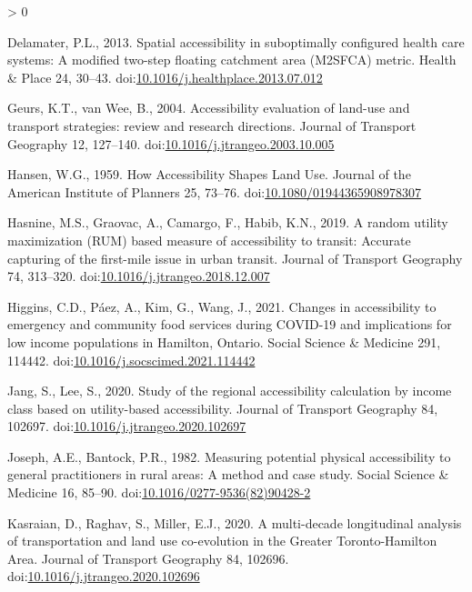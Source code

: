 \documentclass[]{elsarticle} %
\newlength{\cslhangindent}
\newenvironment{CSLReferences}[2] %
 {%
  \setlength{\parindent}{0pt}
  \ifodd #1 \everypar{\setlength{\hangindent}{\cslhangindent}}\ignorespaces\fi
  \ifnum #2 > 0
  \setlength{\parskip}{#2\baselineskip}
  \fi
 }%
 {}
\begin{document}
\begin{CSLReferences}{1}{0}
\leavevmode\hypertarget{ref-delamater2013}{}%
Delamater, P.L., 2013. Spatial accessibility in suboptimally configured
health care systems: A modified two-step floating catchment area
(M2SFCA) metric. Health \& Place 24, 30--43.
doi:\href{https://doi.org/10.1016/j.healthplace.2013.07.012}{10.1016/j.healthplace.2013.07.012}

\leavevmode\hypertarget{ref-geurs2004}{}%
Geurs, K.T., van Wee, B., 2004. Accessibility evaluation of land-use and
transport strategies: review and research directions. Journal of
Transport Geography 12, 127--140.
doi:\href{https://doi.org/10.1016/j.jtrangeo.2003.10.005}{10.1016/j.jtrangeo.2003.10.005}

\leavevmode\hypertarget{ref-hansen1959}{}%
Hansen, W.G., 1959. How Accessibility Shapes Land Use. Journal of the
American Institute of Planners 25, 73--76.
doi:\href{https://doi.org/10.1080/01944365908978307}{10.1080/01944365908978307}

\leavevmode\hypertarget{ref-hasnine2019}{}%
Hasnine, M.S., Graovac, A., Camargo, F., Habib, K.N., 2019. A random
utility maximization (RUM) based measure of accessibility to transit:
Accurate capturing of the first-mile issue in urban transit. Journal of
Transport Geography 74, 313--320.
doi:\href{https://doi.org/10.1016/j.jtrangeo.2018.12.007}{10.1016/j.jtrangeo.2018.12.007}

\leavevmode\hypertarget{ref-higgins2021}{}%
Higgins, C.D., Páez, A., Kim, G., Wang, J., 2021. Changes in
accessibility to emergency and community food services during COVID-19
and implications for low income populations in Hamilton, Ontario. Social
Science \& Medicine 291, 114442.
doi:\href{https://doi.org/10.1016/j.socscimed.2021.114442}{10.1016/j.socscimed.2021.114442}

\leavevmode\hypertarget{ref-jang2020}{}%
Jang, S., Lee, S., 2020. Study of the regional accessibility calculation
by income class based on utility-based accessibility. Journal of
Transport Geography 84, 102697.
doi:\href{https://doi.org/10.1016/j.jtrangeo.2020.102697}{10.1016/j.jtrangeo.2020.102697}

\leavevmode\hypertarget{ref-joseph1982}{}%
Joseph, A.E., Bantock, P.R., 1982. Measuring potential physical
accessibility to general practitioners in rural areas: A method and case
study. Social Science \& Medicine 16, 85--90.
doi:\href{https://doi.org/10.1016/0277-9536(82)90428-2}{10.1016/0277-9536(82)90428-2}

\leavevmode\hypertarget{ref-kasraian2020}{}%
Kasraian, D., Raghav, S., Miller, E.J., 2020. A multi-decade
longitudinal analysis of transportation and land use co-evolution in the
Greater Toronto-Hamilton Area. Journal of Transport Geography 84,
102696.
doi:\href{https://doi.org/10.1016/j.jtrangeo.2020.102696}{10.1016/j.jtrangeo.2020.102696}


\end{CSLReferences}
\end{document}
